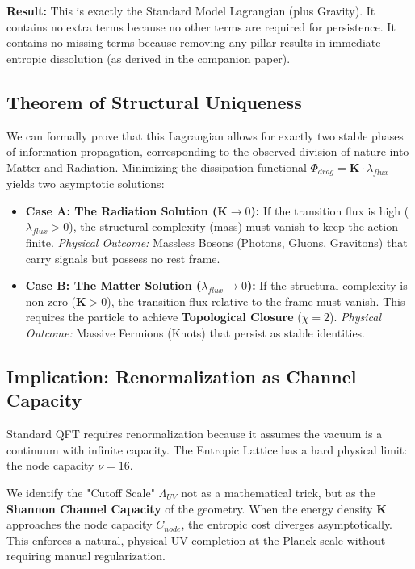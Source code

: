 \textbf{Result:} This is exactly the Standard Model Lagrangian (plus Gravity). It contains no extra terms because no other terms are required for persistence. It contains no missing terms because removing any pillar results in immediate entropic dissolution (as derived in the companion paper).

\subsection{Theorem of Structural Uniqueness}
We can formally prove that this Lagrangian allows for exactly two stable phases of information propagation, corresponding to the observed division of nature into Matter and Radiation.
Minimizing the dissipation functional $\Phi_{drag} = \mathbf{K} \cdot \lambda_{flux}$ yields two asymptotic solutions:

\begin{itemize}
    \item \textbf{Case A: The Radiation Solution ($\mathbf{K} \to 0$):} 
    If the transition flux is high ($\lambda_{flux} > 0$), the structural complexity (mass) must vanish to keep the action finite.
    \textit{Physical Outcome:} Massless Bosons (Photons, Gluons, Gravitons) that carry signals but possess no rest frame.

    \item \textbf{Case B: The Matter Solution ($\lambda_{flux} \to 0$):} 
    If the structural complexity is non-zero ($\mathbf{K} > 0$), the transition flux relative to the frame must vanish. This requires the particle to achieve \textbf{Topological Closure} ($\chi=2$).
    \textit{Physical Outcome:} Massive Fermions (Knots) that persist as stable identities.
\end{itemize}

\subsection{Implication: Renormalization as Channel Capacity}
Standard QFT requires renormalization because it assumes the vacuum is a continuum with infinite capacity. The Entropic Lattice has a hard physical limit: the node capacity $\nu=16$.

We identify the "Cutoff Scale" $\Lambda_{UV}$ not as a mathematical trick, but as the \textbf{Shannon Channel Capacity} of the geometry. When the energy density $\mathbf{K}$ approaches the node capacity $C_{node}$, the entropic cost diverges asymptotically. This enforces a natural, physical UV completion at the Planck scale without requiring manual regularization.


